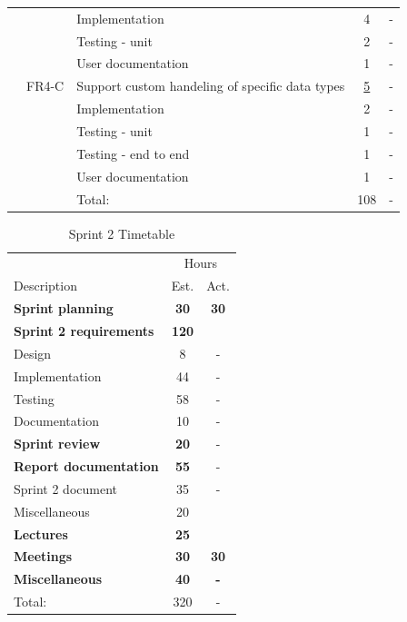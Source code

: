 \begin{table}[!ht]
\begin{tabularx}{\textwidth}{l l X c c}
	   &  & Implementation			   	& 4 & -\\
	   &  & Testing - unit				   	& 2 & -\\
	   &  & User documentation			& 1 & -\\
	\addlinespace
	13 & FR4-C & Support custom handeling of specific data types & \underline{ 5 } & - \\
	   &  & Implementation			   	& 2 & -\\
	   &  & Testing - unit				   	& 1 & -\\
	   &  & Testing - end to end			& 1 & -\\
	   &  & User documentation			& 1 & -\\
	\midrule
	& & Total: & 108  & - \\
	\bottomrule
\end{tabularx}
\end{table}



\begin{table}[!ht] \small \center
\caption{Sprint 2 Timetable\label{tab:sprint2time}}
\begin{tabularx}{\textwidth}{X c c}
	\toprule
	& \multicolumn{2}{c}{Hours} \\
	\cmidrule(r){2-3}
	Description & Est. & Act. \\
	\midrule
	\textbf{Sprint planning} & \textbf{30} & \textbf{30}\\
	\addlinespace
	\textbf{Sprint 2 requirements} & \textbf{120}  & \\
	Design & 8 & -\\
	Implementation & 44 & - \\
	Testing & 58 & -\\
	Documentation & 10 & -\\
	\addlinespace
	\textbf{Sprint review} & \textbf{20} & -\\
	\addlinespace
	\textbf{Report documentation} & \textbf{55} & -\\
		Sprint 2 document & 35 & -\\
		Miscellaneous & 20 &\\
	\addlinespace
	\textbf{Lectures} & \textbf{25} & \\
	\addlinespace
	\textbf{Meetings} & \textbf{30} & \textbf{30}\\
	\addlinespace
	\textbf{Miscellaneous} & \textbf{40} & \textbf{-}\\
	\midrule
	Total: & 320 & - \\
	\bottomrule
\end{tabularx}
\end{table}
